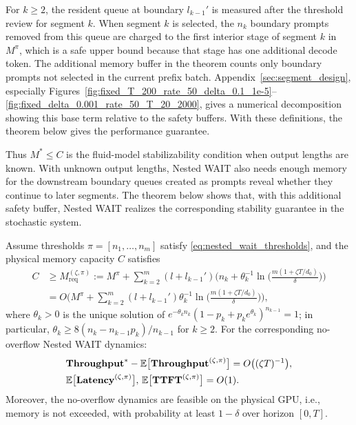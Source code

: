 For \(k\ge2\), the resident queue at boundary \(l_{k-1}'\) is measured after the threshold review for segment \(k\). When segment \(k\) is selected, the \(n_k\) boundary prompts removed from this queue are charged to the first interior stage of segment \(k\) in \(M^\pi\), which is a safe upper bound because that stage has one additional decode token. The additional memory buffer in the theorem counts only boundary prompts not selected in the current prefix batch. Appendix~\ref{sec:segment_design}, especially Figures~\ref{fig:fixed_T_200_rate_50_delta_0.1_1e-5}--\ref{fig:fixed_delta_0.001_rate_50_T_20_2000}, gives a numerical decomposition showing this base term relative to the safety buffers. With these definitions, the theorem below gives the performance guarantee.

Thus \(M^*\le C\) is the fluid-model stabilizability condition when output lengths are known. With unknown output lengths, Nested WAIT also needs enough memory for the downstream boundary queues created as prompts reveal whether they continue to later segments. The theorem below shows that, with this additional safety buffer, Nested WAIT realizes the corresponding stability guarantee in the stochastic system.

\begin{theorem}
\label{thm:nested_wait_heavy_traffic}
Assume thresholds \( \pi = [n_1, \dots, n_m] \) satisfy \eqref{eq:nested_wait_thresholds}, and the physical memory capacity \(C\) satisfies
\begin{equation}
    \label{eq:nested_wait_memory_total}
\begin{aligned}
    C &\ge M_{\mathrm{req}}^{(\zeta,\pi)}
:= M^\pi + \sum_{k=2}^m (l + l_{k-1}') \bigg(n_k + \theta_k^{-1} \ln\Big( \frac{m(1+\zeta T/d_0)}{\delta} \Big)\bigg) \\
&= O\bigg( M^\pi + \sum_{k=2}^m (l + l_{k-1}') \theta_k^{-1}\ln\Big( \frac{m(1+\zeta T/d_0)}{\delta} \Big) \bigg),
\end{aligned}
\end{equation}
where $\theta_k>0$ is the unique solution of \(e^{-\theta_k n_k}(1-p_k+p_ke^{\theta_k})^{n_{k-1}}=1\); in particular, $\theta_k \geq 8(n_k - n_{k-1}p_k)/n_{k-1}$ for \(k\ge 2\). For the corresponding no-overflow Nested WAIT dynamics:
$$
    \begin{aligned}
        &\textbf{Throughput}^* - \mathbb{E}\big[ \textbf{Throughput}^{(\zeta, \pi)} \big] 
   = O\big( (\zeta T)^{-1} \big), \\
&\mathbb{E}\big[ \textbf{Latency}^{(\zeta, \pi)} \big],\,\mathbb{E}\big[ \textbf{TTFT}^{(\zeta, \pi)} \big] = O(1).
    \end{aligned}
$$
Moreover, the no-overflow dynamics are feasible on the physical GPU, i.e., memory is not exceeded, with probability at least \(1-\delta\) over horizon \([0,T]\).
\end{theorem}

